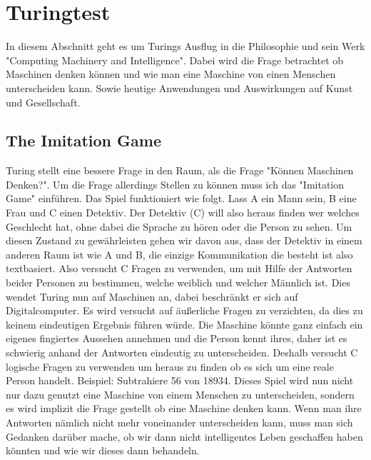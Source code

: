 \section{Turingtest}
\label{turingtest}
In diesem Abschnitt geht es um Turings Ausflug in die Philosophie und sein Werk "Computing Machinery and Intelligence". Dabei wird die Frage betrachtet ob Maschinen denken können und wie man eine Maschine von einen Menschen unterscheiden kann. Sowie heutige Anwendungen und Auswirkungen auf Kunst und Gesellschaft.
\subsection{The Imitation Game}
Turing stellt eine bessere Frage in den Raum, als die Frage "Können Maschinen Denken?". Um die Frage allerdings Stellen zu können muss ich das "Imitation Game" einführen. Das Spiel funktioniert wie folgt. Lass A ein Mann sein, B eine Frau und C einen Detektiv. Der Detektiv (C) will also heraus finden wer welches Geschlecht hat, ohne dabei die Sprache zu hören oder die Person zu sehen. Um diesen Zustand zu gewährleisten gehen wir davon aus, dass der Detektiv in einem anderen Raum ist wie A und B, die einzige Kommunikation die besteht ist also textbasiert. Also versucht C Fragen zu verwenden, um mit Hilfe der Antworten beider Personen zu bestimmen, welche weiblich und welcher Männlich ist. Dies wendet Turing nun auf Maschinen an, dabei beschränkt er sich auf Digitalcomputer. Es wird versucht auf äußerliche Fragen zu verzichten, da dies zu keinem eindeutigen Ergebnis führen würde. Die Maschine könnte ganz einfach ein eigenes fingiertes Aussehen annehmen und die Person kennt ihres, daher ist es schwierig anhand der Antworten eindeutig zu unterscheiden. Deshalb versucht C logische Fragen zu verwenden um heraus zu finden ob es sich um eine reale Person handelt. Beispiel: Subtrahiere 56 von 18934.\cite{computing} Dieses Spiel wird nun nicht nur dazu genutzt eine Maschine von einem Menschen zu unterscheiden, sondern es wird implizit die Frage gestellt ob eine Maschine denken kann. Wenn man ihre Antworten nämlich nicht mehr voneinander unterscheiden kann, muss man sich Gedanken darüber mache,  ob wir dann nicht intelligentes Leben geschaffen haben könnten und wie wir dieses dann behandeln.
